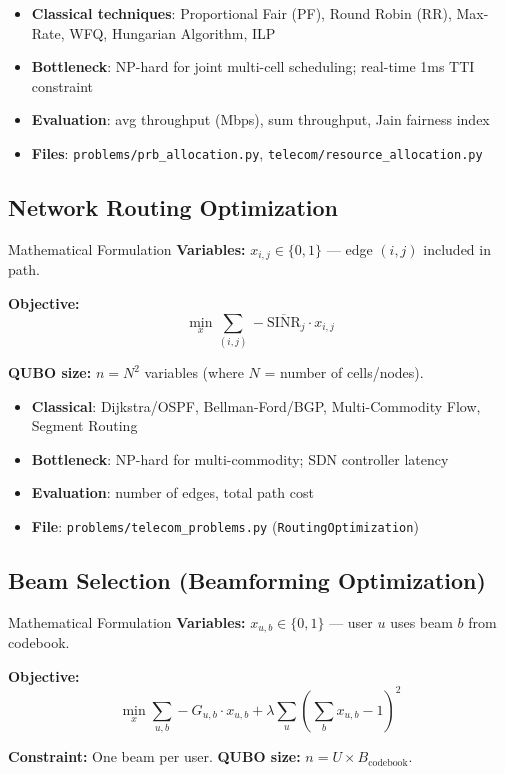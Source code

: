\documentclass[11pt,a4paper]{article}
\begin{document}
\begin{itemize}
  \item \textbf{Classical techniques}: Proportional Fair (PF), Round Robin (RR), Max-Rate, WFQ, Hungarian Algorithm, ILP
  \item \textbf{Bottleneck}: NP-hard for joint multi-cell scheduling; real-time 1ms TTI constraint
  \item \textbf{Evaluation}: avg throughput (Mbps), sum throughput, Jain fairness index
  \item \textbf{Files}: \texttt{problems/prb\_allocation.py}, \texttt{telecom/resource\_allocation.py}
\end{itemize}

\subsection{Network Routing Optimization}

\begin{mathbox}{Mathematical Formulation}
\textbf{Variables:} $x_{i,j} \in \{0,1\}$ — edge $(i,j)$ included in path.

\textbf{Objective:}
$$\min_{x} \sum_{(i,j)} -\overline{\text{SINR}}_j \cdot x_{i,j}$$

\textbf{QUBO size:} $n = N^2$ variables (where $N$ = number of cells/nodes).
\end{mathbox}

\begin{itemize}
  \item \textbf{Classical}: Dijkstra/OSPF, Bellman-Ford/BGP, Multi-Commodity Flow, Segment Routing
  \item \textbf{Bottleneck}: NP-hard for multi-commodity; SDN controller latency
  \item \textbf{Evaluation}: number of edges, total path cost
  \item \textbf{File}: \texttt{problems/telecom\_problems.py} (\texttt{RoutingOptimization})
\end{itemize}

\subsection{Beam Selection (Beamforming Optimization)}

\begin{mathbox}{Mathematical Formulation}
\textbf{Variables:} $x_{u,b} \in \{0,1\}$ — user $u$ uses beam $b$ from codebook.

\textbf{Objective:}
$$\min_{x} \sum_{u,b} -G_{u,b} \cdot x_{u,b} + \lambda \sum_u \left(\sum_b x_{u,b} - 1\right)^2$$

\textbf{Constraint:} One beam per user. \quad \textbf{QUBO size:} $n = U \times B_{\text{codebook}}$.
\end{mathbox}
\end{document}
